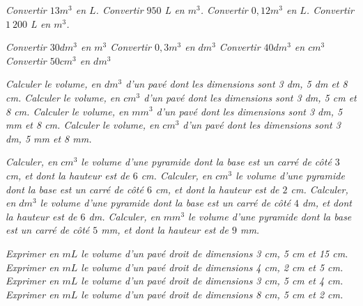 \if {}  \it
  Convertir $13 m^3$ en $L$.
\fi   
\if {} \it
  Convertir $950$ L en $m^3$.
\fi   \if{}  \it
  Convertir $0,12 m^3$ en $L$.
\fi   \if{}  \it
  Convertir $1~200$ L en $m^3$.
\fi
  
 \if {}  \it
  Convertir $30 dm^3$ en $m^3$
\fi   
\if {} \it
  Convertir $0,3 m^3$ en $dm^3$
\fi   \if{}  \it
  Convertir $40 dm^3$ en $cm^3$
\fi   \if{}  \it
  Convertir $50 cm^3$ en $dm^3$
 \fi
 
 \if {}  \it
  Calculer le volume, en $dm^3$ d'un pavé dont les dimensions sont 3 dm, 5 dm et 8 cm.
\fi   
\if {} \it
  Calculer le volume, en $cm^3$ d'un pavé dont les dimensions sont 3 dm, 5 cm et 8 cm.
\fi   \if{}  \it
  Calculer le volume, en $mm^3$ d'un pavé dont les dimensions sont 3 dm, 5 mm et 8 cm.
\fi   \if{}  \it
  Calculer le volume, en $cm^3$ d'un pavé dont les dimensions sont 3 dm, 5 mm et 8 mm.
 \fi
 
 \if {}  \it
  Calculer, en $cm^3$ le volume d'une pyramide dont la base est un carré de côté $3$ cm, et dont la hauteur est de $6$ cm. 
\fi   
\if {} \it
  Calculer, en $cm^3$ le volume d'une pyramide dont la base est un carré de côté $6$ cm, et dont la hauteur est de $2$ cm. 
\fi   \if{}  \it
  Calculer, en $dm^3$ le volume d'une pyramide dont la base est un carré de côté $4$ dm, et dont la hauteur est de $6$ dm. 
\fi   \if{}  \it
  Calculer, en $mm^3$ le volume d'une pyramide dont la base est un carré de côté $5$ mm, et dont la hauteur est de $9$ mm. 
 \fi
 
 \if {}  \it
  Exprimer en $mL$ le volume d'un pavé droit de dimensions 3 cm, 5 cm et 15 cm.
\fi   
\if {} \it
  Exprimer en $mL$ le volume d'un pavé droit de dimensions 4 cm, 2 cm et 5 cm.
\fi   \if{}  \it
  Exprimer en $mL$ le volume d'un pavé droit de dimensions 3 cm, 5 cm et 4 cm.
\fi   \if{}  \it
  Exprimer en $mL$ le volume d'un pavé droit de dimensions 8 cm, 5 cm et 2 cm.
 \fi
 
  
